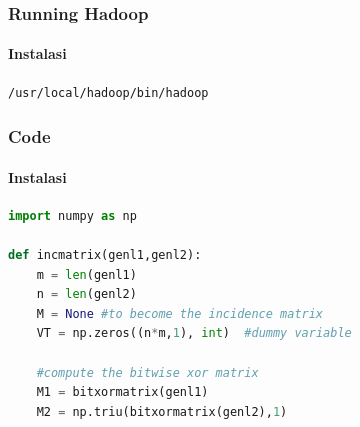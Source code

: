 \documentclass{beamer}
\begin{document}
\begin{frame}[fragile]
\frametitle{Running Hadoop}
\framesubtitle{Instalasi}
\begin{verbatim}
/usr/local/hadoop/bin/hadoop
\end{verbatim}
\end{frame}

\begin{frame}[fragile]
\frametitle{Code}
\framesubtitle{Instalasi}
\begin{lstlisting}[language=Python]
import numpy as np
    
def incmatrix(genl1,genl2):
    m = len(genl1)
    n = len(genl2)
    M = None #to become the incidence matrix
    VT = np.zeros((n*m,1), int)  #dummy variable
    
    #compute the bitwise xor matrix
    M1 = bitxormatrix(genl1)
    M2 = np.triu(bitxormatrix(genl2),1) 
\end{lstlisting}
\end{frame}

\end{document}
